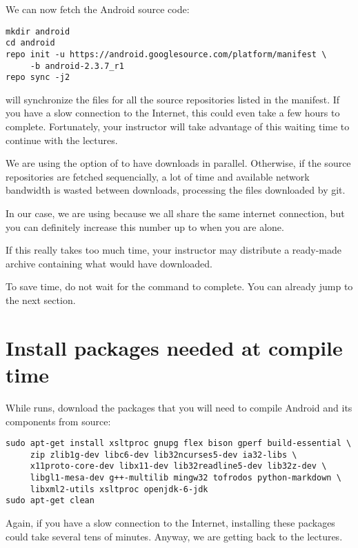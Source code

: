 We can now fetch the Android source code:

\begin{verbatim}
mkdir android
cd android
repo init -u https://android.googlesource.com/platform/manifest \
     -b android-2.3.7_r1
repo sync -j2
\end{verbatim}

 will synchronize the files for all the source
repositories listed in the manifest. If you have a slow connection to
the Internet, this could even take a few hours to
complete. Fortunately, your instructor will take advantage of this
waiting time to continue with the lectures.

We are using the  option of  to have 
downloads in parallel. Otherwise, if the source repositories are fetched
sequencially, a lot of time and available network bandwidth is wasted
between downloads, processing the files downloaded by git.

In our case, we are using  because we all share the same
internet connection, but you can definitely increase this number up to
\code{8} when you are alone.

If this really takes too much time, your instructor may distribute a
ready-made archive containing what \code{repo sync} would have
downloaded.

To save time, do not wait for the  command to
complete. You can already jump to the next section.

\section{Install packages needed at compile time}

While  runs, download the packages that you will need
to compile Android and its components from source:

\begin{verbatim}
sudo apt-get install xsltproc gnupg flex bison gperf build-essential \
     zip zlib1g-dev libc6-dev lib32ncurses5-dev ia32-libs \
     x11proto-core-dev libx11-dev lib32readline5-dev lib32z-dev \
     libgl1-mesa-dev g++-multilib mingw32 tofrodos python-markdown \
     libxml2-utils xsltproc openjdk-6-jdk
sudo apt-get clean
\end{verbatim}

Again, if you have a slow connection to the Internet, installing these
packages could take several tens of minutes. Anyway, we are getting
back to the lectures.
